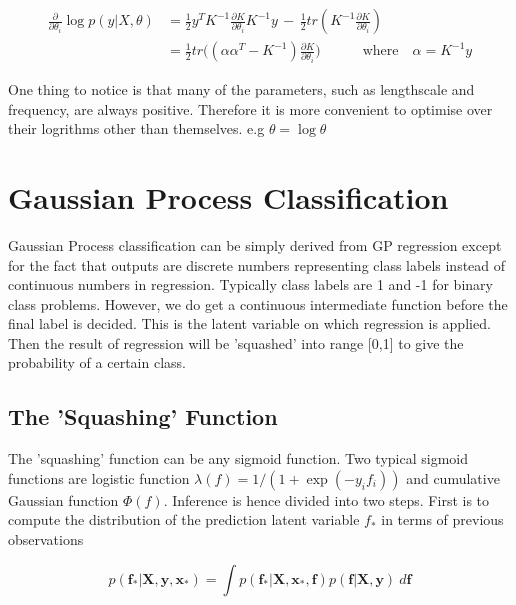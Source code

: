 \documentclass[11pt]{report}
\numberwithin{equation}{chapter}
\begin{document}
\begin{spacing}{2}
\begin{equation}
\begin{split}
\frac{\partial}{\partial \theta_i} \operatorname{log}p(y|X,\theta) & = \frac{1}{2}y^T K^{-1}\frac{\partial K}{\partial \theta_i}K^{-1}y \, - \, \frac{1}{2}tr(K^{-1}\frac{\partial K}{\partial \theta_i}) \\ & = \frac{1}{2}tr\big( (\alpha\alpha^T - K^{-1})\frac{\partial K}{\partial \theta_i}\big) \quad\quad\quad \mbox{where}\quad\alpha = K^{-1}y
\end{split}
\end{equation}

One thing to notice is that many of the parameters, such as lengthscale and frequency, are always positive. Therefore it is more convenient to optimise over their logrithms other than themselves. e.g $\theta = \operatorname{log}\theta$ 









\section{Gaussian Process Classification}
Gaussian Process classification can be simply derived from GP regression except for the fact that outputs are discrete numbers representing class labels instead of continuous numbers in regression. Typically class labels are 1 and -1 for binary class problems. However, we do get a continuous intermediate function before the final label is decided. This is the latent variable on which regression is applied. Then the result of regression will be 'squashed' into range [0,1] to give the probability of a certain class.


\subsection{The 'Squashing' Function}
\label{sigmoid function}
The 'squashing' function can be any sigmoid function. Two typical sigmoid functions are logistic function $\lambda (f) = 1/(1 + \operatorname{exp}(-y_if_i))$ and cumulative Gaussian function $\Phi (f) $. Inference is hence divided into two steps. First is to compute  the distribution of the prediction latent variable $f_*$ in terms of previous observations 

\begin{equation}
\label{classification_prediction}
p(\boldsymbol f_*|\boldsymbol X,\boldsymbol y,\boldsymbol x_*) = \int p(\boldsymbol f_*|\boldsymbol X,\boldsymbol x_*,\boldsymbol f)p(\boldsymbol f|\boldsymbol X,\boldsymbol y)\ d\boldsymbol f
\end{equation}


\end{spacing}
\end{document}
